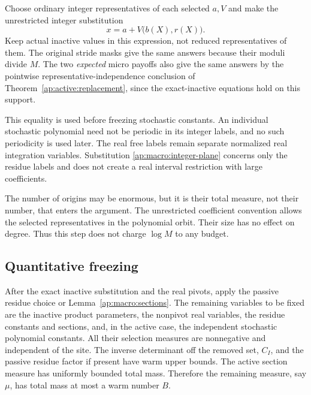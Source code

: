 Choose ordinary integer representatives of each selected $a,V$ and
make the unrestricted integer substitution
\begin{equation}\label{ap:macro:integer-plane}
                          x=a+V\bigl(b(X),r(X)\bigr).
\end{equation}
Keep actual inactive values in this expression, not reduced
representatives of them.  The original stride masks give the same
answers because their moduli divide $M$.  The two \emph{expected}
micro payoffs also give the same answers by the pointwise
representative-independence conclusion of
Theorem~\ref{ap:active:replacement}, since the exact-inactive equations
hold on this support.

This equality is used before freezing stochastic constants.  An
individual stochastic polynomial need not be periodic in its integer
labels, and no such periodicity is used later.  The real free labels
remain separate normalized real integration variables.  Substitution
\eqref{ap:macro:integer-plane} concerns only the residue labels and
does not create a real interval restriction with large coefficients.

The number of origins may be enormous, but it is their total measure,
not their number, that enters the argument.  The unrestricted
coefficient convention allows the selected representatives in the
polynomial orbit.  Their size has no effect on degree.  Thus this step
does not charge $\log M$ to any budget.

\subsection{Quantitative freezing}

After the exact inactive substitution and the real pivots, apply the
passive residue choice or Lemma~\ref{ap:macro:sections}.  The remaining
variables to be fixed are the inactive product parameters, the
nonpivot real variables, the residue constants and sections, and, in
the active case, the independent stochastic polynomial constants.
All their selection measures are nonnegative and independent of the
site.  The inverse determinant off the removed set, $C_I$, and the
passive residue factor if present have warm upper bounds.  The active
section measure has uniformly bounded total mass.  Therefore the
remaining measure, say $\mu$, has total mass at most a warm number $B$.


